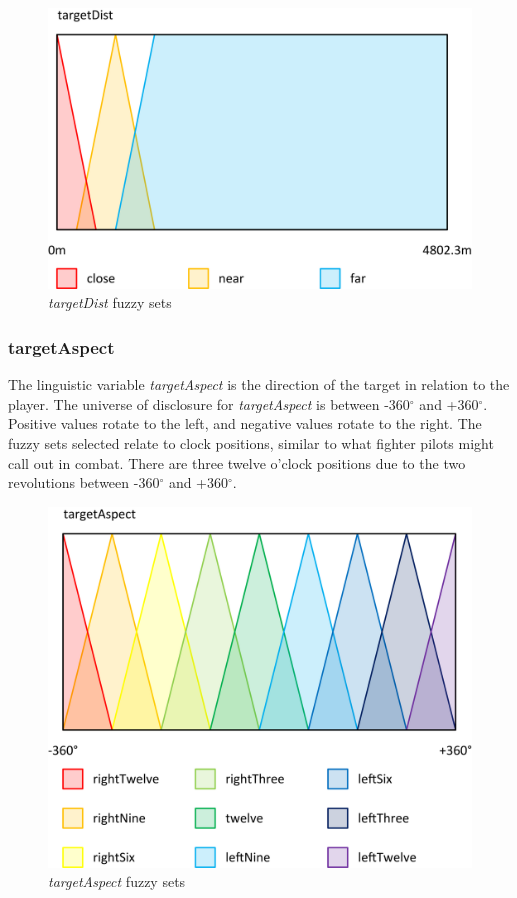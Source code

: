 \begin{figure}[H]
\centering
\caption{\emph{targetDist} fuzzy sets}
\includegraphics[scale=0.08]{./img/pdf/targetDistSets.pdf}
\end{figure}

\subsubsection{targetAspect}

The linguistic variable \emph{targetAspect} is the direction of the target in relation to the player. The universe of disclosure for \emph{targetAspect} is between -360$^{\circ}$ and +360$^{\circ}$. Positive values rotate to the left, and negative values rotate to the right. The fuzzy sets selected relate to clock positions, similar to what fighter pilots might call out in combat. There are three twelve o'clock positions due to the two revolutions between -360$^{\circ}$ and +360$^{\circ}$.

\begin{figure}[H]
\centering
\caption{\emph{targetAspect} fuzzy sets}
\includegraphics[scale=0.08]{./img/pdf/targetAspectSets.pdf}
\end{figure}


